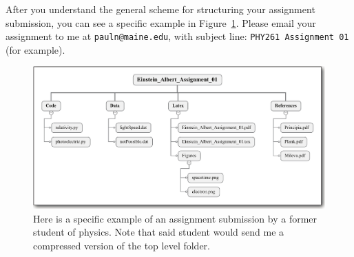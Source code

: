 After you understand the general scheme for structuring your assignment submission, you can see a specific example in Figure~\ref{fig:exampleSubmission}. Please email your assignment to me at \verb!pauln@maine.edu!, with subject line: \verb!PHY261 Assignment 01! (for example).

\begin{figure}[]
	\includegraphics[width=\linewidth]{Figures/digitalSubmission/Example.pdf}
	\caption{Here is a specific example of an assignment submission by a former student of
	physics. Note that said student would send me a compressed version of the top level folder.}\label{fig:exampleSubmission}
\end{figure}
